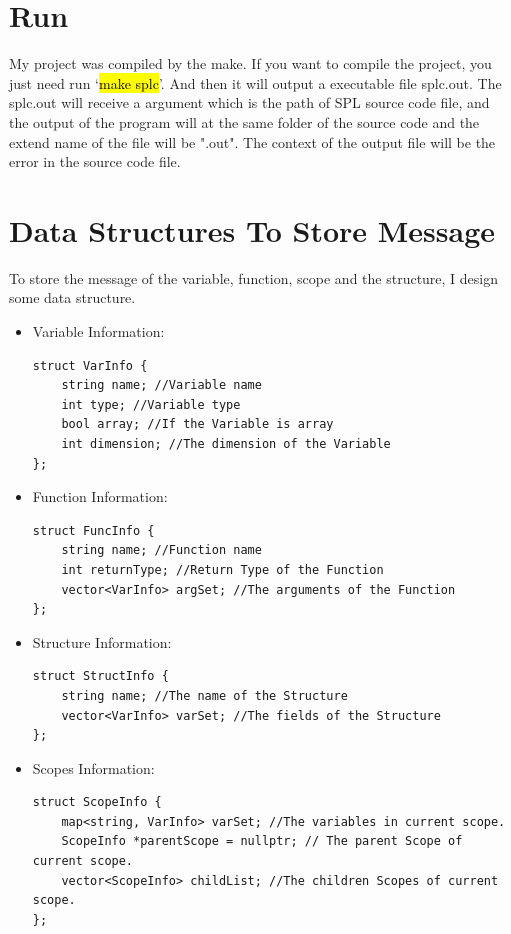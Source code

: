\documentclass{article}
\begin{document}
    \section{Run}
        My project was compiled by the make. If you want to compile the project, you just need run `\hl{make splc}'. 
        And then it will output a executable file splc.out. The splc.out will receive a argument which is the path of 
        SPL source code file, and the output of the program will at the same folder of the source code and the extend name of the file 
        will be ".out". The context of the output file will be the error in the source code file.

    \section{Data Structures To Store Message} 
        To store the message of the variable, function, scope and the structure, I design some data structure.
        \begin{itemize}
            \item Variable Information:
\begin{lstlisting}
struct VarInfo {
    string name; //Variable name
    int type; //Variable type
    bool array; //If the Variable is array
    int dimension; //The dimension of the Variable
};
\end{lstlisting}
            \item Function Information:
\begin{lstlisting}
struct FuncInfo {
    string name; //Function name
    int returnType; //Return Type of the Function
    vector<VarInfo> argSet; //The arguments of the Function
};
\end{lstlisting}  
            \item Structure Information:
\begin{lstlisting}
struct StructInfo {
    string name; //The name of the Structure
    vector<VarInfo> varSet; //The fields of the Structure
};    
\end{lstlisting}
            \item Scopes Information:
\begin{lstlisting}
struct ScopeInfo {
    map<string, VarInfo> varSet; //The variables in current scope.
    ScopeInfo *parentScope = nullptr; // The parent Scope of current scope.
    vector<ScopeInfo> childList; //The children Scopes of current scope.
};
\end{lstlisting}
        \end{itemize}
\end{document}
